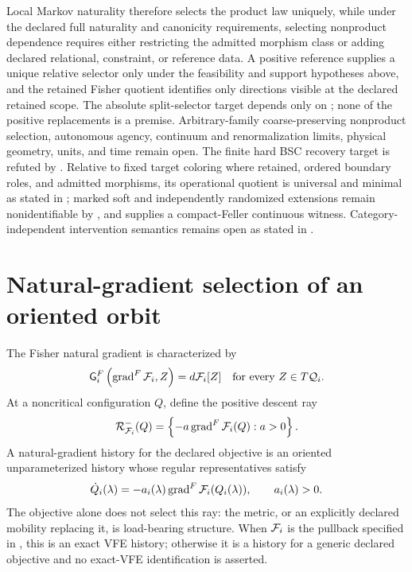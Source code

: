 Local Markov naturality therefore selects the product law uniquely, while
under the declared full naturality and canonicity requirements, selecting
nonproduct dependence requires either restricting the admitted morphism class
or adding declared relational, constraint, or reference data.
A positive reference supplies a unique relative selector only under the
feasibility and support hypotheses above, and the retained Fisher quotient
identifies only directions visible at the declared retained scope.  The
absolute split-selector target depends only on
; none of the positive replacements
is a premise.  Arbitrary-family coarse-preserving nonproduct selection,
autonomous agency, continuum and renormalization limits, physical geometry,
units, and time remain open.  The finite hard BSC recovery target is refuted
by .  Relative to
fixed target coloring where retained, ordered boundary roles, and admitted morphisms, its
operational quotient is universal and minimal as stated in
; marked soft and
independently randomized extensions remain nonidentifiable by
,
and  supplies a
compact-Feller continuous witness.  Category-independent intervention
semantics remains open as stated in
.

\section{Natural-gradient selection of an oriented orbit}
\label{sec:hist-natural-gradient-oriented-orbit}

The Fisher natural gradient is characterized by
\begin{equation}
\mathsf G_i^F\left(\operatorname{grad}^F\mathcal F_i,Z\right)
=d\mathcal F_i[Z]
\quad\text{for every }Z\in T\mathcal Q_i.
\label{eq:hist-fisher-gradient-definition}
\end{equation}
At a noncritical configuration $Q$, define the positive descent ray
\begin{equation}
\mathcal R^-_{\mathcal F_i}(Q)
=\left\{-a\operatorname{grad}^F\mathcal F_i(Q):a>0\right\}.
\label{eq:hist-vfe-descent-ray}
\end{equation}
A natural-gradient history for the declared objective is an oriented
unparameterized history whose regular representatives satisfy
\begin{equation}
\dot Q_i(\lambda)
=-a_i(\lambda)\operatorname{grad}^F\mathcal F_i(Q_i(\lambda)),
\qquad a_i(\lambda)>0.
\label{eq:hist-vfe-ray-representative}
\end{equation}
The objective alone does not select this ray: the metric, or an explicitly
declared mobility replacing it, is load-bearing structure.
When $\mathcal F_i$ is the pullback specified in
, this is an exact VFE history; otherwise it is a
history for a generic declared objective and no exact-VFE identification is
asserted. 

